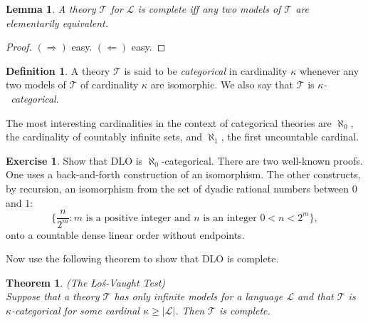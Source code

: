\documentclass[titlepage, oneside]{amsbook}
\theoremstyle{plain}
\newtheorem{theorem}{Theorem}
\newtheorem{lemma}{Lemma}
\theoremstyle{definition}
\newtheorem{exercise}{Exercise}
\newtheorem{definition}{Definition}
\theoremstyle{remark}
\newcommand{\theory}{\ensuremath{\mathcal{T}}}
\newcommand{\lan}{\ensuremath{\mathcal{L}}}
\begin{document}
\begin{lemma}\label{L:com}  A theory $\mathcal{T}$ for $\mathcal{L}$ is
complete iff any 
two models of $\mathcal{T}$ are elementarily equivalent.
\end{lemma}
\begin{proof}
$( \Rightarrow )$ easy.  $(\Leftarrow)$ easy. 
\end{proof}

\begin{definition}
%
 A theory $\mathcal{T}$ is said to be
\emph{categorical } in cardinality $\kappa$ whenever any two models of
$\mathcal{T}$ of 
cardinality $\kappa $ are isomorphic.  We also say that $\theory$ is
\emph{$\kappa$-~categorical}.
\end{definition}


The most interesting cardinalities in the context of categorical
theories are $\aleph_0$, the cardinality of countably infinite sets,
and $\aleph_1$, the first uncountable cardinal.


\begin{exercise}\label{X:cat} Show that DLO is $\aleph_0$-categorical.
There are two
well-known proofs.  One uses a back-and-forth construction of an
isomorphism.  The other constructs, by recursion, an isomorphism from the
set of dyadic rational numbers between $0$ and $1$: \[ \{ \frac{n}{2^m}
:
m \mbox{ is a positive integer and } n \mbox{ is an integer } 0 < n < 2^m
\}, \] onto a countable dense linear order without endpoints.

Now use the following theorem to show that DLO is complete.
\end{exercise}

\begin{theorem} (The {\L}o\'{s}-Vaught Test) \\
%
Suppose that a theory $\mathcal{T}$ has only infinite models for a
language $\lan$
and that $\mathcal{T}$ is $\kappa$-categorical for some cardinal $\kappa 
\geq | \mathcal{L} |$. Then $\mathcal{T}$ is complete.

\end{theorem}
\end{document}
